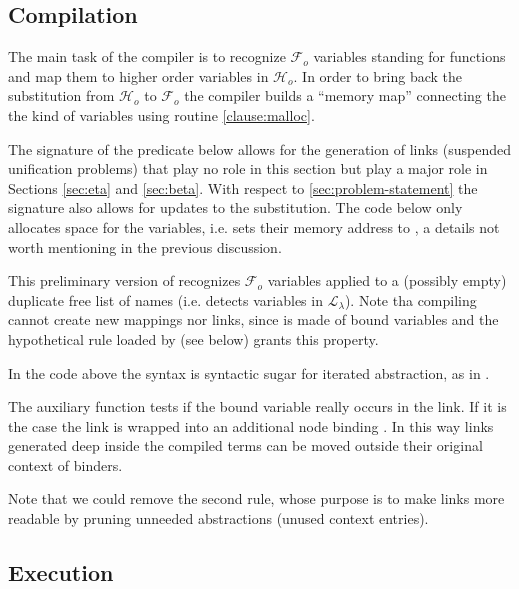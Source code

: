 \documentclass[sigconf,natbib=false,review]{acmart}
\newcommand{\llambda}{\ensuremath{\mathcal{L}_\lambda}\xspace}
\newcommand{\Fo}{\ensuremath{\mathcal{F}_{\!o}\xspace}} %
\newcommand{\Ho}{\ensuremath{\mathcal{H}_o}\xspace}
\begin{document}
\subsection{Compilation}

The main task of the compiler is to recognize \Fo{} variables standing
for functions and map them to higher order variables in \Ho.
In order to bring back the substitution from \Ho{} to \Fo{} the compiler
builds a ``memory map'' connecting the the kind of variables using routine
\ref{clause:malloc}.

The signature of the  predicate below allows for the generation of
links (suspended unification problems) that play no role in this section
but play a major role in Sections \ref{sec:eta} and \ref{sec:beta}.
With respect to \ref{sec:problem-statement} the signature also allows
for updates to the substitution.  The code below only allocates space
for the variables, i.e. sets their memory address to ,
a details not worth mentioning in the previous discussion.



\noindent
This preliminary version of  recognizes \Fo{} variables
applied to a (possibly empty) duplicate free list of names (i.e.
 detects variables in \llambda).
Note tha compiling  cannot create new mappings nor links, since 
is made of bound variables and the hypothetical rule loaded by 
(see below) grants this property.



\noindent
In the code above the syntax  is syntactic sugar for
iterated  abstraction, as in .

The auxiliary function  tests if the bound variable
 really occurs in the link. If it is the case the link is wrapped into
an additional  node binding . In this way links generated
deep inside the compiled terms can be moved outside their original context
of binders.



\noindent
Note that we could remove the second rule, whose purpose is to make
links more readable by pruning unneeded abstractions (unused context entries).

\subsection{Execution}
\label{sec:execution}
\end{document}
